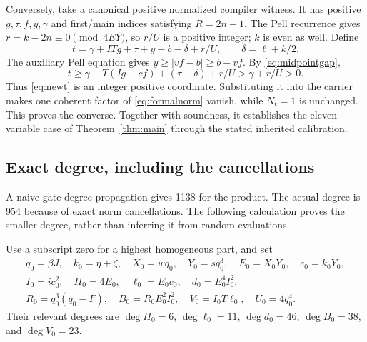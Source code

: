 \documentclass[11pt,a4paper]{article}
\theoremstyle{definition}
\theoremstyle{remark}
\numberwithin{equation}{section}
\begin{document}
Conversely, take a canonical positive normalized compiler witness.
It has positive $g,\tau,f,y,\gamma$ and first/main indices satisfying
$R=2n-1$. The Pell recurrence gives
$r=k-2n\equiv0\pmod{4EY}$, so $r/U$ is a positive integer;
$k$ is even as well. Define
\begin{equation}
 t=\gamma+ITg+\tau+y-b-\delta+r/U,
 \qquad\delta=\ell+k/2.\label{eq:newt}
\end{equation}
The auxiliary Pell equation gives $y\ge|vf-b|\ge b-vf$.
By \eqref{eq:midpointgap},
\[
 t\ge\gamma+T(Ig-cf)+(\tau-\delta)+r/U
   >\gamma+r/U>0.
\]
Thus \eqref{eq:newt} is an integer positive coordinate. Substituting it
into the carrier makes one coherent factor of \eqref{eq:formalnorm}
vanish, while $N_t=1$ is unchanged. This proves the converse.
Together with soundness, it establishes the eleven-variable case of
Theorem~\ref{thm:main} through the stated inherited calibration.

\subsection{Exact degree, including the cancellations}
\label{sec:degree11}

A naive gate-degree propagation gives 1138 for the product. The actual
degree is 954 because of exact norm cancellations. The following
calculation proves the smaller degree, rather than inferring it from
random evaluations.

Use a subscript zero for a highest homogeneous part, and set
\begin{gather*}
 q_0=\beta J,\quad k_0=\eta+\zeta,\quad
 X_0=wq_0,\quad Y_0=sq_0^3,\quad E_0=X_0Y_0,\quad c_0=k_0Y_0,\\
 I_0=ic_0^2,\quad H_0=4E_0,\quad \ell_0=E_0c_0,\quad
 d_0=E_0^4I_0^2,\\
 R_0=q_0^3(q_0-F),\quad B_0=R_0E_0^2I_0^2,\quad
 V_0=I_0T\ell_0,\quad U_0=4q_0^4.
\end{gather*}
Their relevant degrees are
$\deg H_0=6$, $\deg\ell_0=11$, $\deg d_0=46$,
$\deg B_0=38$, and $\deg V_0=23$.
\end{document}
